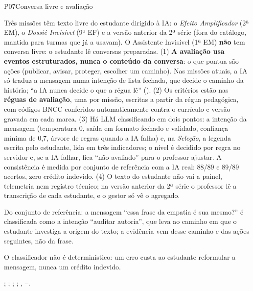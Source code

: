 \begin{resposta}{P07}{Conversa livre e avaliação}{\implementado}
\begin{campos}
  \item[Hoje] Três missões têm texto livre do estudante dirigido à IA: o
    \emph{Efeito Amplificador} (2ª EM), o \emph{Dossiê Invisível} (9º EF) e a
    versão anterior da 2ª série (fora do catálogo, mantida para turmas que já
    a usavam). O Assistente Invisível (1ª EM) \textbf{não} tem conversa
    livre: o estudante lê conversas preparadas. (1) \textbf{A avaliação usa
    eventos estruturados, nunca o conteúdo da conversa}: o que pontua são
    ações (publicar, avisar, proteger, escolher um caminho). Nas missões
    atuais, a IA só traduz a mensagem numa intenção de lista fechada, que
    decide o caminho da história; ``a IA nunca decide o que a régua lê''
    (). (2) Os critérios estão nas \textbf{réguas de
    avaliação}, uma por missão, escritas a partir da régua pedagógica, com
    códigos BNCC conferidos automaticamente contra o currículo e versão
    gravada em cada marca. (3) Há LLM classificando em dois pontos: a
    intenção da mensagem (temperatura 0, saída em formato fechado e validado,
    confiança mínima de 0,7, árvore de regras quando a IA falha) e, na
    \emph{Seleção}, a legenda escrita pelo estudante, lida em três
    indicadores; o nível é decidido por regra no servidor e, se a IA falhar,
    fica ``não avaliado'' para o professor ajustar. A consistência é medida
    por conjunto de referência com a IA real: 88/89 e 89/89 acertos, zero
    crédito indevido. (4) O texto do estudante não vai a painel, telemetria
    nem registro técnico; na versão anterior da 2ª série o professor lê a
    transcrição de cada estudante, e o gestor só vê o agregado.
  \item[Exemplo] Do conjunto de referência: a mensagem ``essa frase da empatia
    é sua mesmo?'' é classificada como a intenção ``auditar autoria'', que
    leva ao caminho em que o estudante investiga a origem do texto; a
    evidência vem desse caminho e das ações seguintes, não da frase.
  \item[Limitações] O classificador não é determinístico: um erro custa ao
    estudante reformular a mensagem, nunca um crédito indevido.
  \item[Evidência] ;
    ;
    ; ;
    , --.
\end{campos}
\end{resposta}

